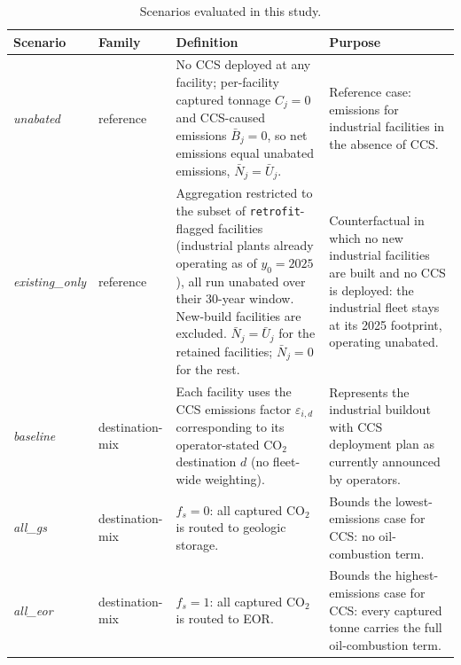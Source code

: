 \documentclass[11pt]{article}
\newcommand{\cotwo}{\ensuremath{\mathrm{CO_2}}}
\begin{document}
\begin{table}[htbp]
\centering
\caption{Scenarios evaluated in this study.}
\label{tab:scenarios}
\footnotesize
{}
\begin{tabular}{@{}l l >{\raggedright\arraybackslash}p{5.5cm} >{\raggedright\arraybackslash}p{4.5cm}@{}}
\toprule
\textbf{Scenario} & \textbf{Family} & \textbf{Definition} & \textbf{Purpose} \\
\midrule
\emph{unabated}    & reference       & No CCS deployed at any facility; per-facility captured tonnage $C_j = 0$ and CCS-caused emissions $\bar{B}_j = 0$, so net emissions equal unabated emissions, $\bar{N}_j = \bar{U}_j$.                                              & Reference case: emissions for industrial facilities in the absence of CCS. \\
\addlinespace
\emph{existing\_only} & reference    & Aggregation restricted to the subset of \texttt{retrofit}-flagged facilities (industrial plants already operating as of $y_0 = 2025$), all run unabated over their 30-year window. New-build facilities are excluded. $\bar{N}_j = \bar{U}_j$ for the retained facilities; $\bar{N}_j = 0$ for the rest.                                                                                                                                                                                                 & Counterfactual in which no new industrial facilities are built and no CCS is deployed: the industrial fleet stays at its 2025 footprint, operating unabated. \\
\addlinespace
\emph{baseline}    & destination-mix & Each facility uses the CCS emissions factor $\varepsilon_{i,d}$ corresponding to its operator-stated \cotwo{} destination $d$ (no fleet-wide weighting).                                                          & Represents the industrial buildout with CCS deployment plan as currently announced by operators. \\
\addlinespace
\emph{all\_gs}     & destination-mix & $f_s = 0$: all captured \cotwo{} is routed to geologic storage.                                                                                                                                                                & Bounds the lowest-emissions case for CCS: no oil-combustion term. \\
\addlinespace
\emph{all\_eor}    & destination-mix & $f_s = 1$: all captured \cotwo{} is routed to EOR.                                                                                                                                                                             & Bounds the highest-emissions case for CCS: every captured tonne carries the full oil-combustion term. \\

\end{tabular}
\end{table}
\end{document}
